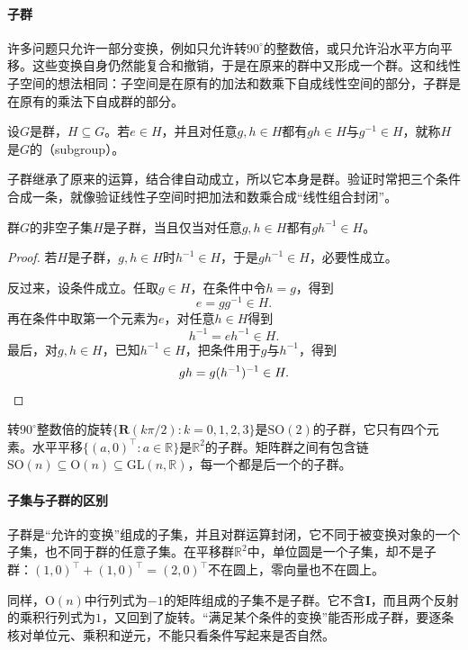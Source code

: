 \paragraph{子群}
许多问题只允许一部分变换，例如只允许转$90^\circ$的整数倍，或只允许沿水平方向平移。这些变换自身仍然能复合和撤销，于是在原来的群中又形成一个群。这和线性子空间的想法相同：子空间是在原有的加法和数乘下自成线性空间的部分，子群是在原有的乘法下自成群的部分。

\begin{definition}[子群]
\label{def:lie-subgroup}
设$G$是群，$H\subseteq G$。若$e\in H$，并且对任意$g,h\in H$都有$gh\in H$与$g^{-1}\in H$，就称$H$是$G$的（subgroup）。
\end{definition}

子群继承了原来的运算，结合律自动成立，所以它本身是群。验证时常把三个条件合成一条，就像验证线性子空间时把加法和数乘合成“线性组合封闭”。

\begin{lemma}[子群判别]
\label{lem:lie-subgroup-criterion}
群$G$的非空子集$H$是子群，当且仅当对任意$g,h\in H$都有$gh^{-1}\in H$。
\end{lemma}

\begin{proof}
若$H$是子群，$g,h\in H$时$h^{-1}\in H$，于是$gh^{-1}\in H$，必要性成立。

反过来，设条件成立。任取$g\in H$，在条件中令$h=g$，得到
\[
e=gg^{-1}\in H.
\]
再在条件中取第一个元素为$e$，对任意$h\in H$得到
\[
h^{-1}=eh^{-1}\in H.
\]
最后，对$g,h\in H$，已知$h^{-1}\in H$，把条件用于$g$与$h^{-1}$，得到
\[
gh=g(h^{-1})^{-1}\in H.\qedhere
\]
\end{proof}

转$90^\circ$整数倍的旋转$\{\bm R(k\pi/2):k=0,1,2,3\}$是$\mathrm{SO}(2)$的子群，它只有四个元素。水平平移$\{(a,0)^\top:a\in\mathbb R\}$是$\mathbb R^2$的子群。矩阵群之间有包含链$\mathrm{SO}(n)\subseteq\mathrm O(n)\subseteq\mathrm{GL}(n,\mathbb R)$，每一个都是后一个的子群。

\paragraph{子集与子群的区别}
子群是“允许的变换”组成的子集，并且对群运算封闭，它不同于被变换对象的一个子集，也不同于群的任意子集。在平移群$\mathbb R^2$中，单位圆是一个子集，却不是子群：$(1,0)^\top+(1,0)^\top=(2,0)^\top$不在圆上，零向量也不在圆上。

同样，$\mathrm O(n)$中行列式为$-1$的矩阵组成的子集不是子群。它不含$\bm I$，而且两个反射的乘积行列式为$1$，又回到了旋转。“满足某个条件的变换”能否形成子群，要逐条核对单位元、乘积和逆元，不能只看条件写起来是否自然。

